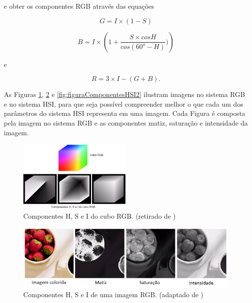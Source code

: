 \documentclass[	12pt, Times, openright, twoside, a4paper, english, brazil]{abntex2}
\begin{document}
e obter os componentes RGB através das equações

\begin{equation}
G=I \times (1-S)
\end{equation}

\begin{equation}
B=I  \times \left( 1 +  \frac{S \times cosH}{cos (60^o - H)} ) \right)
\end{equation}

e

\begin{equation}
R=3 \times I-(G+B).
\end{equation}

As Figuras \ref{fig:figuraCuboRGB}, \ref{fig:figuraComponentesHSI} e \ref{fig:figuraComponentesHSI2} ilustram imagens no sistema RGB e no sistema HSI, para que seja possível compreender melhor o que cada um dos parâmetros do sistema HSI representa em uma imagem. Cada Figura é composta pela imagem no sistema RGB e as componentes matiz, saturação e intensidade da imagem.

\begin{figure}[!htb]
\centering \includegraphics[width=0.5\textwidth]{figuraCuboRGB.png}
\caption{Componentes H, S e I do cubo RGB. (retirado de ) \label{fig:figuraCuboRGB}}
\end{figure}

\begin{figure}[!htb]
\centering \includegraphics[width=\textwidth]{figuraComponentesHSI.png}
\caption{Componentes H, S e I de uma imagem RGB. (adaptado de ) \label{fig:figuraComponentesHSI}}
\end{figure}
\end{document}

